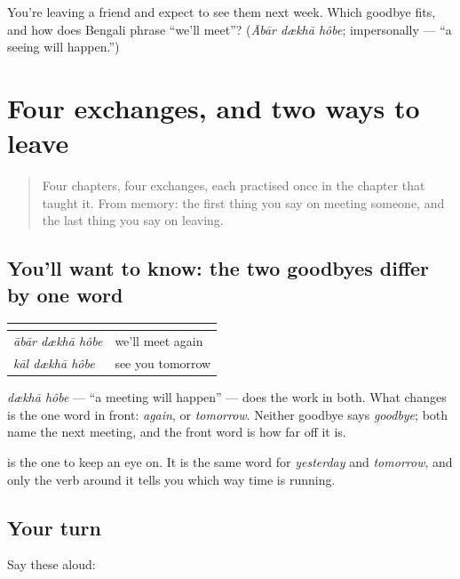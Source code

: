\begin{tcolorbox}[breakable,colback=teal!4,colframe=teal!35!black,title={Before you move on}]
You're leaving a friend and expect to see them next week. Which goodbye fits, and how does Bengali phrase \textquotedblleft{}we'll meet\textquotedblright{}? (\emph{Ābār dækhā hôbe}; impersonally — \textquotedblleft{}a seeing will happen.\textquotedblright{})
\end{tcolorbox}
\section[(practice)]{Four exchanges, and two ways to leave}

\label{lesson:BN-R08-second-pass-four-exchanges}



\begin{quote}
Four chapters, four exchanges, each practised once in the chapter that taught it. From memory: the first thing you say on meeting someone, and the last thing you say on leaving.
\end{quote}

\subsection*{You'll want to know: the two goodbyes differ by one word}
\noindent
\begin{tabularx}{\linewidth}{@{}>{\raggedright\arraybackslash}X>{\raggedright\arraybackslash}X@{}}
\toprule
\textbf{} & \textbf{} \\
\midrule
\emph{ābār dækhā hôbe} & we'll meet again \\
\emph{kāl dækhā hôbe} & see you tomorrow \\
\bottomrule
\end{tabularx}

\emph{dækhā hôbe} — \textquotedblleft{}a meeting will happen\textquotedblright{} — does the work in both. What changes is the one word in front: \emph{again}, or \emph{tomorrow}. Neither goodbye says \emph{goodbye}; both name the next meeting, and the front word is how far off it is.

\textbf{} is the one to keep an eye on. It is the same word for \emph{yesterday} and \emph{tomorrow}, and only the verb around it tells you which way time is running.

\subsection*{Your turn}
Say these aloud:

